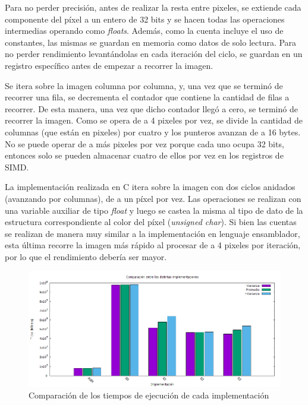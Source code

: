 \documentclass[a4paper]{article}
\begin{document}
Para no perder precisión, antes de realizar la resta entre pixeles, se extiende cada componente del píxel a un entero de 32 bits y se hacen todas las operaciones intermedias operando como \textit{floats}. Además, como la cuenta incluye el uso de constantes, las mismas se guardan en memoria como datos de solo lectura. Para no perder rendimiento levantándolas en cada iteración del ciclo, se guardan en un registro específico antes de empezar a recorrer la imagen.

Se itera sobre la imagen columna por columna, y, una vez que se terminó de recorrer una fila, se decrementa el contador que contiene la cantidad de filas a recorrer. De esta manera, una vez que dicho contador llegó a cero, se terminó de recorrer la imagen. Como se opera de a 4 pixeles por vez, se divide la cantidad de columnas (que están en pixeles) por cuatro y los punteros avanzan de a 16 bytes. No se puede operar de a más pixeles por vez porque cada uno ocupa 32 bits, entonces solo se pueden almacenar cuatro de ellos por vez en los registros de SIMD.
\bigskip

La implementación realizada en C itera sobre la imagen con dos ciclos anidados (avanzando por columnas), de a un píxel por vez. Las operaciones se realizan con una variable auxiliar de tipo \textit{float} y luego se castea la misma al tipo de dato de la estructura correspondiente al color del píxel (\textit{unsigned char}). Si bien las cuentas se realizan de manera muy similar a la implementación en lenguaje ensamblador, esta última recorre la imagen más rápido al procesar de a 4 pixeles por iteración, por lo que el rendimiento debería ser mayor. 
\\
\begin{figure}[H]
  \begin{center}
	\includegraphics[scale=0.6]{imagenes/combinarC.png}
	\caption{Comparación de los tiempos de ejecución de cada implementación}
	\label{combinar_asmvsc}
  \end{center}
\end{figure}
\end{document}
